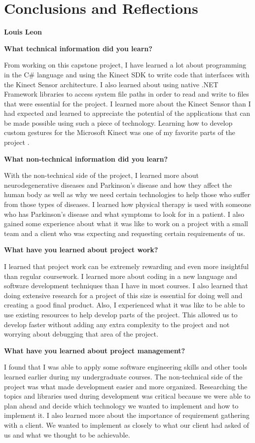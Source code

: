 \documentclass[onecolumn, draftclsnofoot,10pt, compsoc]{IEEEtran}
\begin{document}
\section{Conclusions and Reflections}
\begin{flushleft}
{\large\textbf{Louis Leon}\par}
\textbf{What technical information did you learn?}\par
From working on this capstone project, I have learned a lot about programming in the C\# language and using the Kinect SDK to write code that interfaces with the Kinect Sensor architecture. I also learned about using native .NET Framework libraries to access system file paths in order to read and write to files that were essential for the project. I learned more about the Kinect Sensor than I had expected and learned to appreciate the potential of the applications that can be made possible using such a piece of technology. Learning how to develop custom gestures for the Microsoft Kinect was one of my favorite parts of the project \cite{KinectDevelop}. 

\textbf{What non-technical information did you learn?}\par
With the non-technical side of the project, I learned more about neurodegenerative diseases and Parkinson's disease and how they affect the human body as well as why we need certain technologies to help those who suffer from those types of diseases. I learned how physical therapy is used with someone who has Parkinson's disease and what symptoms to look for in a patient. I also gained some experience about what it was like to work on a project with a small team and a client who was expecting and requesting certain requirements of us.

\textbf{What have you learned about project work?}\par
I learned that project work can be extremely rewarding and even more insightful than regular coursework. I learned more about coding in a new language and software development techniques than I have in most courses. I also learned that doing extensive research for a project of this size is essential for doing well and creating a good final product. Also, I experienced what it was like to be able to use existing resources to help develop parts of the project. This allowed us to develop faster without adding any extra complexity to the project and not worrying about debugging that area of the project.

\textbf{What have you learned about project management?}\par
I found that I was able to apply some software engineering skills and other tools learned earlier during my undergraduate courses. The non-technical side of the project was what made development easier and more organized. Researching the topics and libraries used during development was critical because we were able to plan ahead and decide which technology we wanted to implement and how to implement it. I also learned more about the importance of requirement gathering with a client. We wanted to implement as closely to what our client had asked of us and what we thought to be achievable. 


\end{flushleft}
\end{document}
